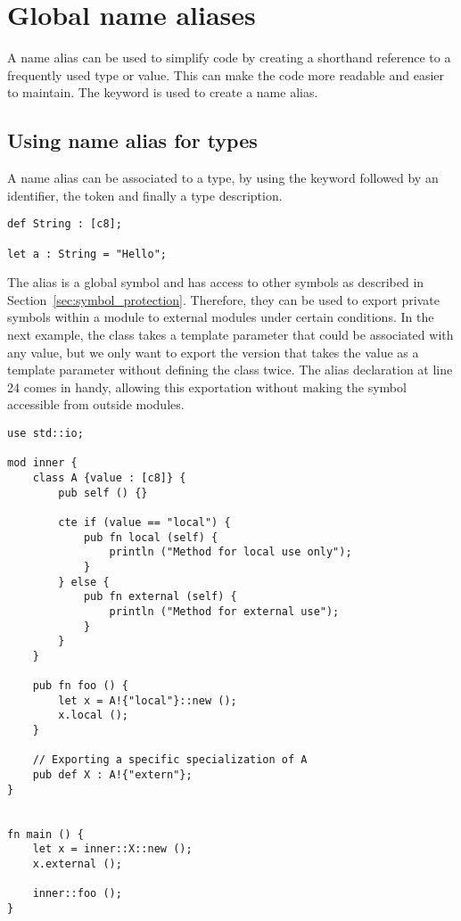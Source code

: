 \vfill%
\pagebreak

\section{Global name aliases}
\label{sec:global_alias_names}

A name alias can be used to simplify code by creating a shorthand reference to a
frequently used type or value. This can make the code more readable and easier
to maintain. The keyword  is used to create a name alias.

\subsection {Using name alias for types}

A name alias can be associated to a type, by using the keyword 
followed by an identifier, the token \token{:} and finally a type description.

\begin{lstlisting}[style=coloredverbatim]
def String : [c8];

let a : String = "Hello";
\end{lstlisting}

The alias is a global symbol and has access to other symbols as described in
Section~\ref{sec:symbol_protection}. Therefore, they can be used to export
private symbols within a module to external modules under certain conditions. In
the next example, the class  takes a template parameter that could be
associated with any value, but we only want to export the version that takes the
value  as a template parameter without defining the class twice.
The alias declaration  at line 24 comes in handy, allowing this
exportation without making the symbol  accessible from outside modules.

\begin{lstlisting}[style=coloredverbatim]
use std::io;

mod inner {
    class A {value : [c8]} {
        pub self () {}

        cte if (value == "local") {
            pub fn local (self) {
                println ("Method for local use only");
            }
        } else {
            pub fn external (self) {
                println ("Method for external use");
            }
        }
    }

    pub fn foo () {
        let x = A!{"local"}::new ();
        x.local ();
    }

    // Exporting a specific specialization of A
    pub def X : A!{"extern"};
}


fn main () {
    let x = inner::X::new ();
    x.external ();

    inner::foo ();
}
\end{lstlisting}

